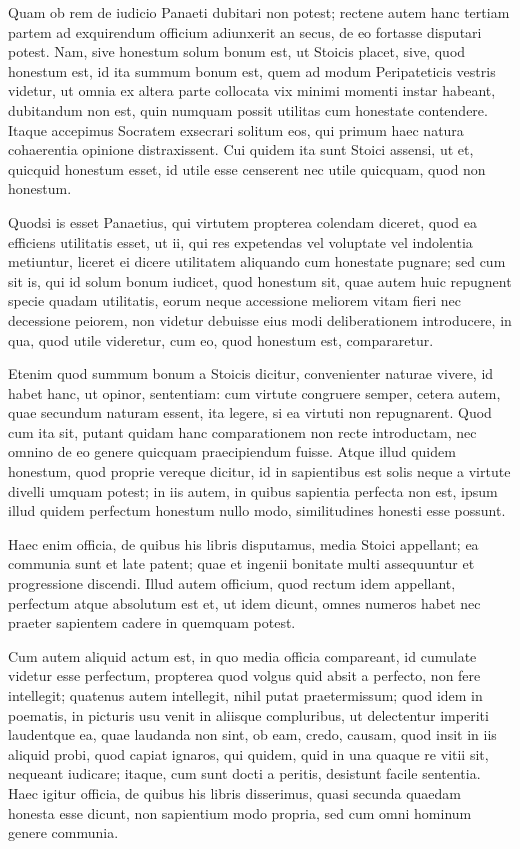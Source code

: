  Quam ob rem de iudicio Panaeti dubitari non potest; rectene autem hanc tertiam partem ad exquirendum officium adiunxerit an secus, de eo fortasse disputari potest. Nam, sive honestum solum bonum est, ut Stoicis placet, sive, quod honestum est, id ita summum bonum est, quem ad modum Peripateticis vestris videtur, ut omnia ex altera parte collocata vix minimi momenti instar habeant, dubitandum non est, quin numquam possit utilitas cum honestate contendere. Itaque accepimus Socratem exsecrari solitum eos, qui primum haec natura cohaerentia opinione distraxissent. Cui quidem ita sunt Stoici assensi, ut et, quicquid honestum esset, id utile esse censerent nec utile quicquam, quod non honestum.

 Quodsi is esset Panaetius, qui virtutem propterea colendam diceret, quod ea efficiens utilitatis esset, ut ii, qui res expetendas vel voluptate vel indolentia metiuntur, liceret ei dicere utilitatem aliquando cum honestate pugnare; sed cum sit is, qui id solum bonum iudicet, quod honestum sit, quae autem huic repugnent specie quadam utilitatis, eorum neque accessione meliorem vitam fieri nec decessione peiorem, non videtur debuisse eius modi deliberationem introducere, in qua, quod utile videretur, cum eo, quod honestum est, compararetur.

 Etenim quod summum bonum a Stoicis dicitur, convenienter naturae vivere, id habet hanc, ut opinor, sententiam: cum virtute congruere semper, cetera autem, quae secundum naturam essent, ita legere, si ea virtuti non repugnarent. Quod cum ita sit, putant quidam hanc comparationem non recte introductam, nec omnino de eo genere quicquam praecipiendum fuisse. Atque illud quidem honestum, quod proprie vereque dicitur, id in sapientibus est solis neque a virtute divelli umquam potest; in iis autem, in quibus sapientia perfecta non est, ipsum illud quidem perfectum honestum nullo modo, similitudines honesti esse possunt.

 Haec enim officia, de quibus his libris disputamus, media Stoici appellant; ea communia sunt et late patent; quae et ingenii bonitate multi assequuntur et progressione discendi. Illud autem officium, quod rectum idem appellant, perfectum atque absolutum est et, ut idem dicunt, omnes numeros habet nec praeter sapientem cadere in quemquam potest.

 Cum autem aliquid actum est, in quo media officia compareant, id cumulate videtur esse perfectum, propterea quod volgus quid absit a perfecto, non fere intellegit; quatenus autem intellegit, nihil putat praetermissum; quod idem in poematis, in picturis usu venit in aliisque compluribus, ut delectentur imperiti laudentque ea, quae laudanda non sint, ob eam, credo, causam, quod insit in iis aliquid probi, quod capiat ignaros, qui quidem, quid in una quaque re vitii sit, nequeant iudicare; itaque, cum sunt docti a peritis, desistunt facile sententia. Haec igitur officia, de quibus his libris disserimus, quasi secunda quaedam honesta esse dicunt, non sapientium modo propria, sed cum omni hominum genere communia.


